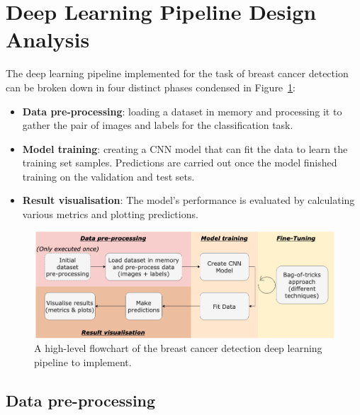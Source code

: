 
\section{Deep Learning Pipeline Design Analysis}

The deep learning pipeline implemented for the task of breast cancer detection can be broken down in four distinct phases condensed in Figure~\ref{fig:design-flowchart}:

\begin{itemize}
    \item \textbf{Data pre-processing}: loading a dataset in memory and processing it to gather the pair of images and labels for the classification task.
    \item \textbf{Model training}: creating a CNN model that can fit the data to learn the training set samples. Predictions are carried out once the model finished training on the validation and test sets.
    \item \textbf{Result visualisation}: The model's performance is evaluated by calculating various metrics and plotting predictions.
\end{itemize}

\begin{figure}[ht]
\centerline{\includegraphics[width=\textwidth]{figures/design/design flowchart.png}}
\caption{\label{fig:design-flowchart}A high-level flowchart of the breast cancer detection deep learning pipeline to implement.}
\end{figure}


\subsection{Data pre-processing}

